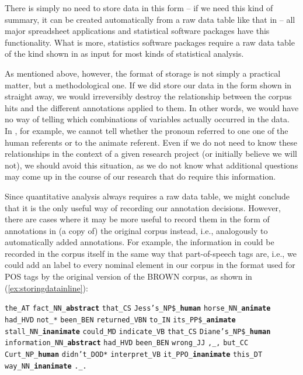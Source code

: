 There is simply no need to store  data in this form -- if we need this kind of summary, it can be created automatically from a raw data table like that in  -- all major spreadsheet applications and statistical software packages have this functionality. What is more, statistics  software packages require a raw data table of the kind shown in  as input for most kinds of statistical analysis.

As mentioned above, however, the format of storage  is not simply a practical matter, but a methodological one. If we did store our data in the form shown in  straight away, we would irreversibly destroy the relationship between the corpus hits  and the different annotations  applied to them. In other words, we would have no way of telling which combinations of variables actually occurred in the data. In , for example, we cannot tell whether the pronoun  referred to one one of the human  referents or to the animate referent. Even if we do not need to know these relationships in the context of a given research project (or initially believe we will not), we should avoid this situation, as we do not know what additional questions may come up in the course of our research that do require this information.

Since quantitative  analysis always requires a raw data table, we might conclude that it is the only useful way of recording our annotation decisions. However, there are cases where it may be more useful to record them in the form of annotations  in (a copy of) the original corpus instead, i.e., analogously to automatically added annotations. For example, the information in  could be recorded in the corpus itself in the same way that part\hyp{}of\hyp{}speech tags are, i.e., we could add an   label to every nominal  element in our corpus in the format used for POS tags by the original version of the BROWN  corpus, as shown in (\ref{ex:storingdatainline}):

\begin{exe}
\ex \begin{minipage}[t]{\textwidth} \raggedright \texttt{the\_AT} \texttt{fact\_NN\_\textbf{abstract}} \texttt{that\_CS} \texttt{Jess's\_NP\$\_\textbf{human}} \texttt{horse\_NN\_\textbf{animate}} \texttt{had\_HVD} \texttt{not\_*} \texttt{been\_BEN} \texttt{returned\_VBN} \texttt{to\_IN} \texttt{its\_PP\$\_\textbf{animate}} \texttt{stall\_NN\_\textbf{inanimate}} \texttt{could\_MD} \texttt{indicate\_VB} \texttt{that\_CS} \texttt{Diane's\_NP\$\_\textbf{human}} \texttt{information\_NN\_\textbf{abstract}} \texttt{had\_HVD} \texttt{been\_BEN} \texttt{wrong\_JJ} \texttt{,\_,} \texttt{but\_CC} \texttt{Curt\_NP\_\textbf{human}} \texttt{didn't\_DOD*} \texttt{interpret\_VB} \texttt{it\_PPO\_\textbf{inanimate}} \texttt{this\_DT} \texttt{way\_NN\_\textbf{inanimate}} \texttt{.\_.} \end{minipage}
\label{ex:storingdatainline}
\end{exe}

